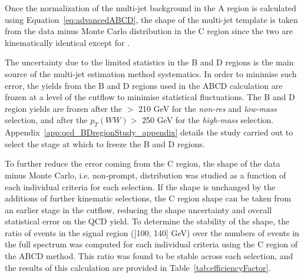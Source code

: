 Once the normalization of the multi-jet background in the A region is calculated using Equation~\ref{eq:advancedABCD}, the shape of the multi-jet template is taken from the data minus Monte Carlo distribution in the C region since the two are kinematically identical except for \dsig.

The uncertainty due to the limited statistics in the B and D regions is the
main source of the multi-jet estimation method systematics. In order to minimise
such error,  the yields from the  B and D regions used in the ABCD
calculation are frozen at a level of the cutflow to minimise statistical fluctuations.
The B and D region yields are frozen after the \ptbb $>$ 210 GeV for the \emph{non-res} and \emph{low-mass} selection, and after the $p_{T}(WW)>$ 250 GeV for the \emph{high-mass} selection. Appendix~\ref{app:qcd_BDregionStudy_appendix} details the study carried out to select the stage at which to freeze the B and D regions. 

To further reduce the error coming from the C region, the shape of the data minus Monte Carlo, i.e. non-prompt, 
\mbb distribution was studied as a function of each individual criteria for each selection. If the \mbb shape is 
unchanged by the additions of further kinematic selections, the C region shape can be taken from an 
earlier stage in the cutflow, reducing the shape uncertainty and overall statistical error on the QCD yield.
To determine the stability of the \mbb shape, the ratio of events in the \mbb signal region ([100, 140] GeV)
over the numbers of events in the full \mbb spectrum was computed for each individual criteria using the C region 
of the ABCD method. This ratio was found to be stable across each selection, and the results of this 
calculation are provided in Table~\ref{tab:efficiencyFactor}. 

